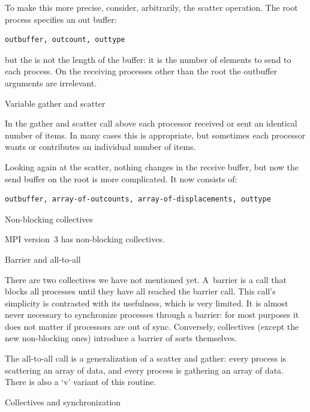 To make this more precise, consider, arbitrarily,
the scatter operation. The root process specifies an out buffer:
\begin{verbatim}
outbuffer, outcount, outtype
\end{verbatim}
but the  is not the length of the buffer: it is the number
of elements to send to each process.
On the receiving processes other than the root the outbuffer arguments are irrelevant.

 {Variable gather and scatter}

In the gather and scatter call above each processor received or sent
an identical number of items. In many cases this is appropriate, but
sometimes each processor wants or contributes an individual number of
items.

Looking again at the scatter, nothing changes in the receive buffer,
but now the send buffer on the root is more complicated. It now consists of:
\begin{verbatim}
outbuffer, array-of-outcounts, array-of-displacements, outtype
\end{verbatim}

 {Non-blocking collectives}
\label{sec:mpi3collect}

MPI version~3 has non-blocking collectives.

 {Barrier and all-to-all}

There are two collectives we have not mentioned yet. A~barrier is a
call that blocks all processes until they have all reached the barrier
call. This call's simplicity is contrasted with its usefulness, which
is very limited. It is almost never necessary to synchronize processes
through a barrier: for most purposes it does not matter if processors
are out of sync. Conversely, collectives (except the new non-blocking
ones) introduce a barrier of sorts themselves.

The all-to-all call is a generalization of a scatter and gather: every
process is scattering an array of data, and every process is gathering
an array of data. There is also a `v' variant of this routine.

 {Collectives and synchronization}

